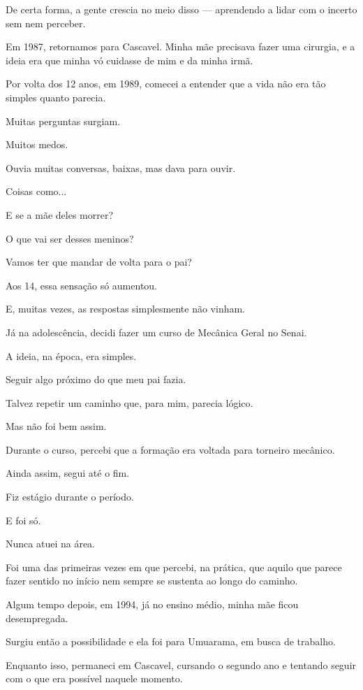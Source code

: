 De certa forma, a gente crescia no meio disso — aprendendo a lidar com o incerto sem nem perceber.

Em 1987, retornamos para Cascavel. Minha mãe precisava fazer uma cirurgia, e a ideia era que minha vó cuidasse de mim e da minha irmã.


Por volta dos 12 anos, em 1989, comecei a entender que a vida não era tão simples quanto parecia.

Muitas perguntas surgiam. 

Muitos medos. 

Ouvia muitas conversas, baixas, mas dava para ouvir. 

Coisas como... 

E se a mãe deles morrer? 

O que vai ser desses meninos? 

Vamos ter que mandar de volta para o pai?

Aos 14, essa sensação só aumentou.

E, muitas vezes, as respostas simplesmente não vinham.

Já na adolescência, decidi fazer um curso de Mecânica Geral no Senai. 

A ideia, na época, era simples. 

Seguir algo próximo do que meu pai fazia. 

Talvez repetir um caminho que, para mim, parecia lógico.

Mas não foi bem assim.

Durante o curso, percebi que a formação era voltada para torneiro mecânico. 

Ainda assim, segui até o fim. 

Fiz estágio durante o período.

E foi só.

Nunca atuei na área.

Foi uma das primeiras vezes em que percebi, na prática, que aquilo que parece fazer sentido no início nem sempre se sustenta ao longo do caminho.


Algum tempo depois, em 1994, já no ensino médio, minha mãe ficou desempregada. 

Surgiu então a possibilidade e ela foi para Umuarama, em busca de trabalho.

Enquanto isso, permaneci em Cascavel, cursando o segundo ano e tentando seguir com o que era possível naquele momento.

